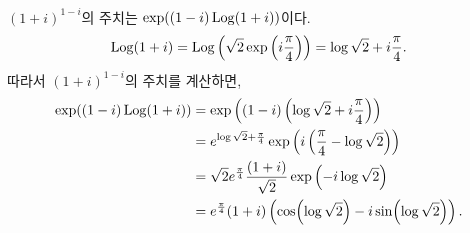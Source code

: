 $(1+i)^{1-i}$의 주치는 $\exp((1-i)\mathop{\mathrm{Log}}(1+i))$이다.
\[
\mathop{\mathrm{Log}}(1+i)  = \mathop{\mathrm{Log}} \left( \sqrt{2}\exp\left(i \displaystyle\frac\pi4\right)\right)
= \log\sqrt{2} + i \displaystyle\frac\pi4.
\]
따라서 $(1+i)^{1-i}$의 주치를 계산하면,
\begin{align*}
\exp((1-i)\mathop{\mathrm{Log}}(1+i)) &= \exp\left( (1-i)\left(\log\sqrt{2} + i \displaystyle\frac\pi4\right)\right) \\
&= e^{\log\sqrt{2} + \frac\pi4} \exp \left( i\left( \displaystyle\frac\pi4 - \log\sqrt{2} \right)\right) \\
&= \sqrt{2} e^{\frac\pi4} \displaystyle\frac{(1+i)}{\sqrt{2}} \exp\left(-i\log\sqrt{2}\right) \\
&=e^{\frac\pi4}(1+i)\left(\cos (\log\sqrt{2}) - i \sin(\log\sqrt{2})\right).
\end{align*}













